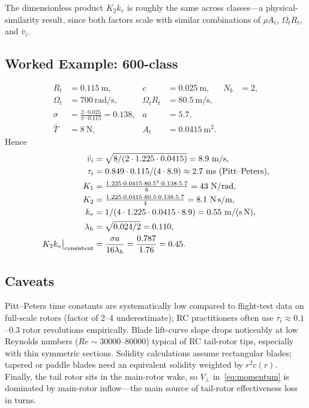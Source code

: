 \documentclass[11pt,a4paper]{article}
\newcommand{\OmegaT}{\Omega_t}
\newcommand{\Rt}{R_t}
\newcommand{\At}{A_t}
\newcommand{\bvi}{\bar{v}_i}
\newcommand{\bT}{\bar{T}}
\begin{document}
\noindent The dimensionless product \(K_2 k_v\) is roughly the same across
classes---a physical-similarity result, since both factors scale with similar
combinations of \(\rho\At\), \(\OmegaT\Rt\), and \(\bvi\).

\subsection{Worked Example: 600-class}

\begin{align*}
\Rt &= 0.115~\text{m}, & c &= 0.025~\text{m}, & N_b &= 2,\\
\OmegaT &= 700~\text{rad/s}, & \OmegaT\Rt &= 80.5~\text{m/s},\\
\sigma &= \tfrac{2\cdot 0.025}{\pi\cdot 0.115} = 0.138, & a &= 5.7,\\
\bT &= 8~\text{N}, & \At &= 0.0415~\text{m}^2.
\end{align*}
Hence
\begin{align*}
\bvi &= \sqrt{8/(2\cdot 1.225\cdot 0.0415)} = 8.9~\text{m/s},\\
\tau_i &= 0.849\cdot 0.115/(4\cdot 8.9) \approx 2.7~\text{ms (Pitt--Peters)},\\
K_1 &= \tfrac{1.225\cdot 0.0415\cdot 80.5^2\cdot 0.138\cdot 5.7}{6} = 43~\text{N/rad},\\
K_2 &= \tfrac{1.225\cdot 0.0415\cdot 80.5\cdot 0.138\cdot 5.7}{4} = 8.1~\text{N\,s/m},\\
k_v &= 1/(4\cdot 1.225\cdot 0.0415\cdot 8.9) = 0.55~\text{m/(s\,N)},\\
\lambda_h &= \sqrt{0.024/2} = 0.110,\\
K_2k_v\big|_\text{consistent} &= \frac{\sigma a}{16\lambda_h} = \frac{0.787}{1.76} = 0.45.
\end{align*}

\subsection{Caveats}

Pitt--Peters time constants are systematically low compared to flight-test
data on full-scale rotors (factor of 2--4 underestimate); RC practitioners
often use \(\tau_i\approx 0.1\)--\(0.3\) rotor revolutions empirically.
Blade lift-curve slope drops noticeably at low Reynolds numbers
(\(Re\sim\num{30000}\)--\num{80000}) typical of RC tail-rotor tips,
especially with thin symmetric sections. Solidity calculations assume
rectangular blades; tapered or paddle blades need an equivalent solidity
weighted by \(r^2 c(r)\). Finally, the tail rotor sits in the main-rotor
wake, so \(V_\perp\) in~\eqref{eq:momentum} is dominated by main-rotor
inflow---the main source of tail-rotor effectiveness loss in turns.
\end{document}
